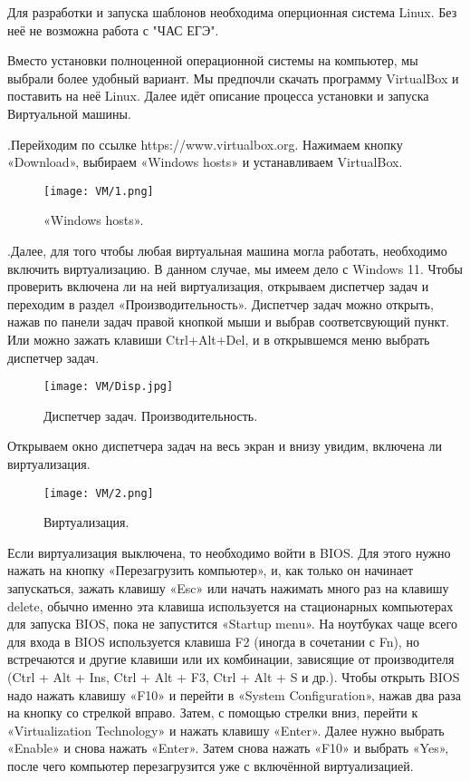 Для разработки и запуска шаблонов необходима оперционная система Linux. Без неё не возможна работа с "ЧАС ЕГЭ".

Вместо установки полноценной операционной системы на компьютер, мы выбрали более удобный вариант. Мы предпочли скачать программу VirtualBox и поставить на неё Linux. Далее идёт описание процесса установки и запуска Виртуальной машины.

.\quad Перейходим по ссылке https://www.virtualbox.org. Нажимаем кнопку «Download», выбираем «Windows hosts» и устанавливаем VirtualBox. 

\begin{figure}[h]	
		\centering
		\texttt{[image: VM/1.png]}
\caption{«Windows hosts».}
\label{ris:image}
\end{figure}

.\quad Далее, для того чтобы любая виртуальная машина могла работать, необходимо включить виртуализацию. В данном случае, мы имеем дело с Windows 11. Чтобы проверить включена ли на ней виртуализация, открываем диспетчер задач и переходим в раздел «Производительность». Диспетчер задач можно открыть, нажав по панели задач правой кнопкой мыши и выбрав соответсвующий пункт. Или можно зажать клавиши Ctrl+Alt+Del, и в открывшемся меню выбрать диспетчер задач.

\begin{figure}[h]
		\centering
		\texttt{[image: VM/Disp.jpg]}
\caption{Диспетчер задач. Производительность.}
\label{ris:image}
\end{figure}


 Открываем окно диспетчера задач на весь экран и внизу увидим, включена ли виртуализация.

\begin{figure}[h]
		\centering
		\texttt{[image: VM/2.png]}
\caption{Виртуализация.}
\label{ris:image}
\end{figure}

\quad Если виртуализация выключена, то необходимо войти в BIOS. Для этого нужно нажать на кнопку «Перезагрузить компьютер», и, как только он начинает запускаться, зажать клавишу «Esc» или начать нажимать много раз на клавишу delete, обычно именно эта клавиша используется на стационарных компьютерах для запуска BIOS, пока не запустится «Startup menu». На ноутбуках чаще всего для входа в BIOS используется клавиша F2 (иногда в сочетании с Fn), но встречаются и другие клавиши или их комбинации, зависящие от производителя (Ctrl + Alt + Ins, Ctrl + Alt + F3, Ctrl + Alt + S и др.). Чтобы открыть BIOS надо нажать клавишу «F10» и перейти в «System Configuration», нажав два раза на кнопку со стрелкой вправо. Затем, с помощью стрелки вниз, перейти к «Virtualization Technology» и нажать клавишу «Enter». Далее нужно выбрать «Enable» и снова нажать «Enter». Затем снова нажать «F10» и выбрать «Yes», после чего компьютер перезагрузится уже с включённой виртуализацией.


